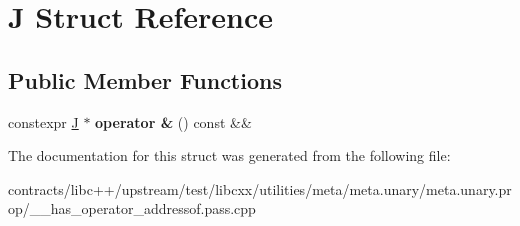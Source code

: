 \hypertarget{struct_j}{}\section{J Struct Reference}
\label{struct_j}
\subsection*{Public Member Functions}
\begin{DoxyCompactItemize}
\item 
\mbox{\label{struct_j_a1b9c8e0f8911e6d454eb36f0a2491544}} 
constexpr \mbox{\hyperlink{struct_j}{J}} $\ast$ {\bfseries operator \&} () const \&\&
\end{DoxyCompactItemize}


The documentation for this struct was generated from the following file\+:\begin{DoxyCompactItemize}
\item 
contracts/libc++/upstream/test/libcxx/utilities/meta/meta.\+unary/meta.\+unary.\+prop/\+\_\+\+\_\+has\+\_\+operator\+\_\+addressof.\+pass.\+cpp\end{DoxyCompactItemize}
